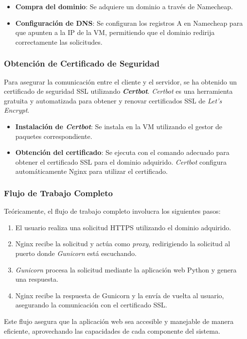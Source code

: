 \begin{itemize}
	\item \textbf{Compra del dominio}: Se adquiere un dominio a través de Namecheap.
	\item \textbf{Configuración de DNS}: Se configuran los registros A en Namecheap para que apunten a la IP de la VM, permitiendo que el dominio redirija correctamente las solicitudes.
\end{itemize}

\subsubsection{Obtención de Certificado de Seguridad}

Para asegurar la comunicación entre el cliente y el servidor, se ha obtenido un certificado de seguridad SSL utilizando \textbf{\textit{Certbot}}. \textit{Certbot} es una herramienta gratuita y automatizada para obtener y renovar certificados SSL de \textit{Let's Encrypt}.

\begin{itemize}
	\item \textbf{Instalación de \textit{Certbot}}: Se instala en la VM utilizando el gestor de paquetes correspondiente.
	\item \textbf{Obtención del certificado}: Se ejecuta con el comando adecuado para obtener el certificado SSL para el dominio adquirido. \textit{Certbot} configura automáticamente Nginx para utilizar el certificado.
\end{itemize}


\subsubsection{Flujo de Trabajo Completo}

Teóricamente, el flujo de trabajo completo involucra los siguientes pasos:

\begin{enumerate}
	\item El usuario realiza una solicitud HTTPS utilizando el dominio adquirido.
	\item Nginx recibe la solicitud y actúa como \textit{proxy}, redirigiendo la solicitud al puerto donde \textit{Gunicorn} está escuchando.
	\item \textit{Gunicorn} procesa la solicitud mediante la aplicación web Python y genera una respuesta.
	\item Nginx recibe la respuesta de Gunicorn y la envía de vuelta al usuario, asegurando la comunicación con el certificado SSL.
\end{enumerate}

Este flujo asegura que la aplicación web sea accesible y manejable de manera eficiente, aprovechando las capacidades de cada componente del sistema.
